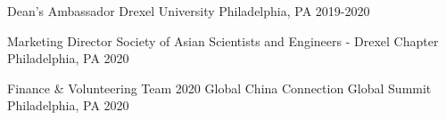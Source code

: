 

\begin{cvhonors}

  \cvhonor
  {Dean's Ambassador} %
  {Drexel University} %
  {Philadelphia, PA} %
  {2019-2020} %

  \cvhonor
  {Marketing Director} %
  {Society of Asian Scientists and Engineers - Drexel Chapter} %
  {Philadelphia, PA} %
  {2020} %

  \cvhonor
  {Finance \& Volunteering Team} %
  {2020 Global China Connection Global Summit} %
  {Philadelphia, PA} %
  {2020} %

\end{cvhonors}
